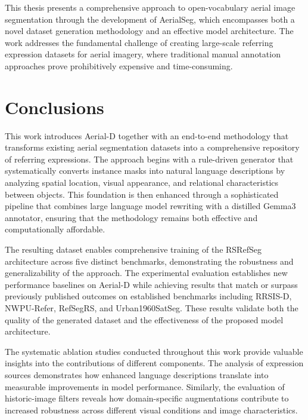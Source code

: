 \cleardoublepage
\label{chap:conclusion}

This thesis presents a comprehensive approach to open-vocabulary aerial image segmentation through the development of AerialSeg, which encompasses both a novel dataset generation methodology and an effective model architecture. The work addresses the fundamental challenge of creating large-scale referring expression datasets for aerial imagery, where traditional manual annotation approaches prove prohibitively expensive and time-consuming.

\section{Conclusions}

This work introduces Aerial-D together with an end-to-end methodology that transforms existing aerial segmentation datasets into a comprehensive repository of referring expressions. The approach begins with a rule-driven generator that systematically converts instance masks into natural language descriptions by analyzing spatial location, visual appearance, and relational characteristics between objects. This foundation is then enhanced through a sophisticated pipeline that combines large language model rewriting with a distilled Gemma3 annotator, ensuring that the methodology remains both effective and computationally affordable.

The resulting dataset enables comprehensive training of the RSRefSeg architecture across five distinct benchmarks, demonstrating the robustness and generalizability of the approach. The experimental evaluation establishes new performance baselines on Aerial-D while achieving results that match or surpass previously published outcomes on established benchmarks including RRSIS-D, NWPU-Refer, RefSegRS, and Urban1960SatSeg. These results validate both the quality of the generated dataset and the effectiveness of the proposed model architecture.

The systematic ablation studies conducted throughout this work provide valuable insights into the contributions of different components. The analysis of expression sources demonstrates how enhanced language descriptions translate into measurable improvements in model performance. Similarly, the evaluation of historic-image filters reveals how domain-specific augmentations contribute to increased robustness across different visual conditions and image characteristics.

